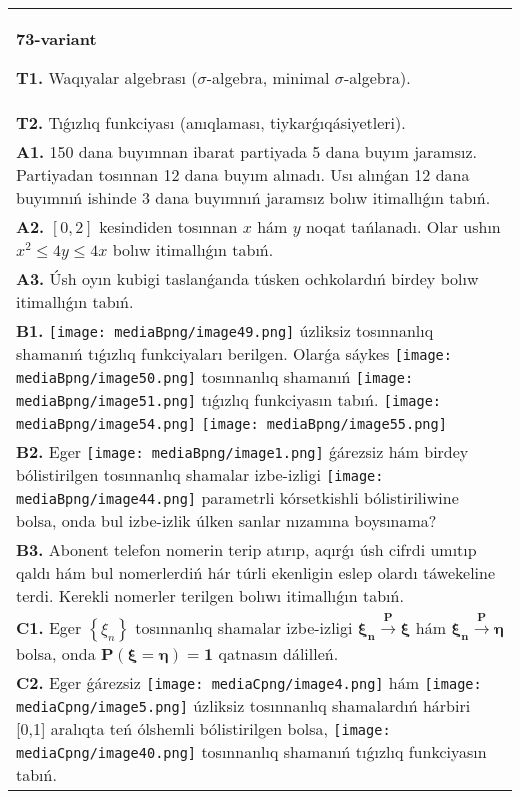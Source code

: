 \documentclass{article}
\begin{document}
\begin{tabular}{m{17cm}}
\textbf{73-variant}
\newline

\textbf{T1.} Waqıyalar algebrası ($\sigma$-algebra, minimal $\sigma$-algebra).
 \\
\textbf{T2.} Tıǵızlıq funkciyası (anıqlaması, tiykarǵıqásiyetleri).
 \\
\textbf{A1.} 150 dana buyımnan ibarat partiyada 5 dana buyım jaramsız. Partiyadan tosınnan 12 dana buyım alınadı. Usı alınǵan 12 dana buyımnıń ishinde 3 dana buyımnıń jaramsız bolıw itimallıǵın tabıń. 
 \\
\textbf{A2.} $\left[ 0,2 \right]$ kesindiden tosınnan $x$ hám $y$ noqat tańlanadı. Olar ushın ${{x}^{2}}\le 4y\le 4x$ bolıw itimallıǵın tabıń.
 \\
\textbf{A3.} Úsh oyın kubigi taslanǵanda túsken ochkolardıń birdey bolıw itimallıǵın tabıń.
 \\
\textbf{B1.} \texttt{[image: mediaBpng/image49.png]} úzliksiz tosınnanlıq shamanıń tıǵızlıq funkciyaları berilgen. Olarǵa sáykes \texttt{[image: mediaBpng/image50.png]} tosınnanlıq shamanıń \texttt{[image: mediaBpng/image51.png]} tıǵızlıq funkciyasın tabıń. \texttt{[image: mediaBpng/image54.png]} \texttt{[image: mediaBpng/image55.png]}
 \\
\textbf{B2.} Eger \texttt{[image: mediaBpng/image1.png]} ǵárezsiz hám birdey bólistirilgen tosınnanlıq shamalar izbe-izligi \texttt{[image: mediaBpng/image44.png]} parametrli kórsetkishli bólistiriliwine bolsa, onda bul izbe-izlik úlken sanlar nızamına boysınama?
 \\
\textbf{B3.} Abonent telefon nomerin terip atırıp, aqırǵı úsh cifrdi umıtıp qaldı hám bul nomerlerdiń hár túrli ekenligin eslep olardı táwekeline terdi. Kerekli nomerler terilgen bolıwı itimallıǵın tabıń.
 \\
\textbf{C1.} Eger \(\left\{ \xi_{n} \right\}\) tosınnanlıq shamalar izbe-izligi \(\mathbf{\xi}_{\mathbf{n}}\overset{\mathbf{P}}{\rightarrow}\mathbf{\xi}\) hám \(\mathbf{\xi}_{\mathbf{n}}\overset{\mathbf{P}}{\rightarrow}\mathbf{\eta}\) bolsa, onda \(\mathbf{P}\left( \mathbf{\xi = \eta} \right)\mathbf{=}\mathbf{1}\) qatnasın dálilleń.
 \\
\textbf{C2.} Eger ǵárezsiz \texttt{[image: mediaCpng/image4.png]} hám \texttt{[image: mediaCpng/image5.png]} úzliksiz tosınnanlıq shamalardıń hárbiri {[}0,1{]} aralıqta teń ólshemli bólistirilgen bolsa, \texttt{[image: mediaCpng/image40.png]} tosınnanlıq shamanıń tıǵızlıq funkciyasın tabıń.

\end{tabular}
\end{document}
